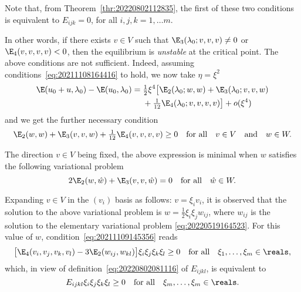 \begin{remark}
  Note that, from Theorem~\ref{thr:20220802112835}, the first of these two conditions is equivalent to $E_{ijk}=0$, for
  all $i, j, k = 1, \ldots m$.
\end{remark}

In other words, if there exists $v \in V$ such that $\E_3(\lambda_0; v, v, v) \neq 0$ or $\E_4(v, v, v, v) < 0$, then
the equilibrium is \emph{unstable} at the critical point. The above conditions are not sufficient. Indeed, assuming
conditions~\eqref{eq:20211108164416} to hold, we now take $\eta = \xi^2$
\begin{equation}
  \begin{aligned}[b]
    \E(u_0 + u, \lambda_0) - \E(u_0, \lambda_0) ={} & \tfrac{1}{2} \xi^4 \bigl[ \E_2(\lambda_0; w, w) + \E_3(\lambda_0; v, v, w)\\
    & + \tfrac{1}{12} \E_4(\lambda_0; v, v, v, v) \bigr] + o(\xi^4)
  \end{aligned}
\end{equation}
and we get the further necessary condition
\begin{equation}
  \label{eq:20211109145356}
  \E_2(w, w) + \E_3(v, v, w) + \tfrac{1}{12} \E_4(v, v, v, v) \geq 0 \quad \text{for all} \quad v \in V \quad \text{and} \quad w \in W.
\end{equation}

The direction $v \in V$ being fixed, the above expression is minimal when $w$ satisfies the following variational
problem
\begin{equation}
  \label{eq:20211109145224}
  2\E_2(w, \hat{w}) +\E_3(v, v, \hat{w}) = 0 \quad \text{for all} \quad \hat{w} \in W.
\end{equation}

Expanding $v \in V$ in the $(v_i)$ basis as follows: $v = \xi_i v_i$, it is observed that the solution to the above
variational problem is $w = \tfrac{1}{2} \xi_i \xi_j w_{ij}$, where $w_{ij}$ is the solution to the elementary
variational problem \eqref{eq:20220519164523}. For this value of $w$, condition~\eqref{eq:20211109145356} reads
\begin{equation}
  \bigl[\E_4(v_i, v_j, v_k, v_l) - 3\E_2(w_{ij}, w_{kl})\bigr] \xi_i \xi_j \xi_k \xi_l \geq 0 \quad \text{for all} \quad \xi_1, \ldots, \xi_m \in \reals,
\end{equation}
which, in view of definition~\eqref{eq:20220802081116} of $E_{ijkl}$, is equivalent to
\begin{equation}
  E_{ijkl} \xi_i \xi_j \xi_k \xi_l \geq 0 \quad \text{for all} \quad \xi_m, \ldots, \xi_m \in \reals.
\end{equation}

